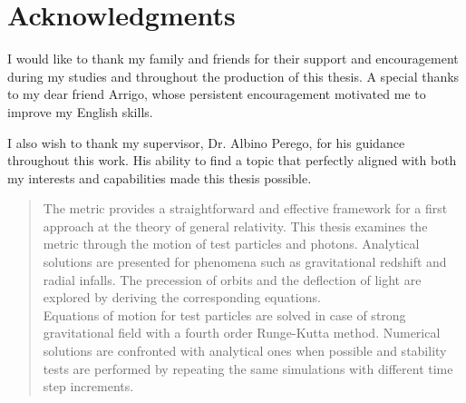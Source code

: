 

\LogoWidth{4.5cm} %

\begin{titlepage}
    \pagestyle{empty}
    \makefrontpage
    \restoregeometry
\end{titlepage}

\thispagestyle{empty}
\frontmatter


\chapter*{Acknowledgments}
I would like to thank my family and friends for their support and encouragement
during my studies and throughout the production of this thesis.
A special thanks to my dear friend Arrigo, whose persistent encouragement
motivated me to improve my English skills.

I also wish to thank my supervisor, Dr. Albino Perego, for his guidance
throughout this work.
His ability to find a topic that perfectly aligned with both my interests and
capabilities made this thesis possible.

\begin{abstract}
    The \Sh metric provides a straightforward and effective framework for a
    first approach at the theory of general relativity.
    This thesis examines the metric through the motion of test particles and
    photons.
    Analytical solutions are presented for phenomena such as gravitational
    redshift and radial infalls. The precession of orbits and the deflection of
    light are explored by deriving the corresponding equations. \\
    Equations of motion for test particles are solved in case of strong
    gravitational field with a fourth order Runge-Kutta method.
    Numerical solutions are confronted with analytical ones when possible and
    stability tests are performed by repeating the same simulations with
    different time step increments.
\end{abstract}

